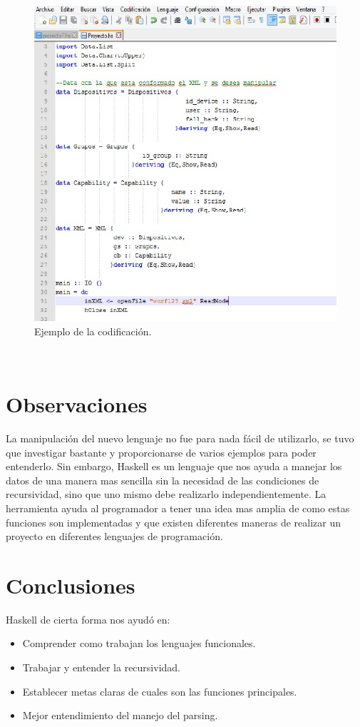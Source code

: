 \documentclass[12pt]{book} %
\begin{document}
\begin{figure}[h!]
        \begin{center}
        \includegraphics[scale=0.7]{ejemplo2.jpg}
        \end{center}
        \caption{Ejemplo de la codificaci\'on.}
\end{figure}~\\[2cm]
\chapter{Observaciones}
La manipulaci\'on del nuevo lenguaje no fue para nada f\'acil de utilizarlo, se tuvo que investigar bastante y proporcionarse de varios ejemplos para poder entenderlo. Sin embargo, Haskell es un lenguaje que nos ayuda a manejar los datos de una manera mas sencilla sin la necesidad de las condiciones de recursividad, sino que uno mismo debe realizarlo independientemente. La herramienta ayuda al programador a tener una idea mas amplia de como estas funciones son implementadas y que existen diferentes maneras de realizar un proyecto en diferentes lenguajes de programaci\'on.
\chapter{Conclusiones}
Haskell de cierta forma nos ayud\'o en: 
\begin{itemize}
  \item Comprender como trabajan los lenguajes funcionales.
  \item Trabajar y entender la recursividad.
  \item Establecer metas claras de cuales son las funciones principales.
  \item Mejor entendimiento del manejo del parsing.
\end{itemize}
\end{document}
